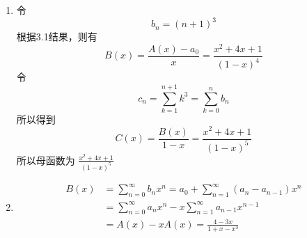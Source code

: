 \documentclass[a4paper]{article}
\begin{document}
\begin{enumerate}[]
\begin{solution}
\end{solution}


\item 
\begin{solution}
    令
    \begin{equation*}
        b_n=(n+1)^3
    \end{equation*}
    根据3.1结果，则有
    \begin{equation*}
        B(x)=\frac{A(x)-a_0}{x} = \frac{x^2+4x+1}{(1-x)^4}
    \end{equation*}
    令
    \begin{equation*}
        c_n=\sum_{k=1}^{n+1}k^3 = \sum_{k=0}^{n} b_n
    \end{equation*}
    所以得到
    \begin{equation*}
        C(x) = \frac{B(x)}{1-x} = \frac{x^2+4x+1}{(1-x)^5}
    \end{equation*}
    所以母函数为 $\frac{x^2+4x+1}{(1-x)^5}$
    
\end{solution}

\item 
\begin{solution}
    \begin{align*}
        B(x)&=\sum_{n=0}^{\infty} b_n x^n = a_0+\sum_{n=1}^{\infty} (a_n-a_{n-1})x^n \\
        &= \sum_{n=0}^{\infty} a_n x^n - x \sum_{n=1}^{\infty} a_{n-1}x^{n-1} \\
        &= A(x)-xA(x) = \frac{4-3x}{1+x-x^3}
    \end{align*}
\end{solution}


\end{enumerate}
\end{document}
